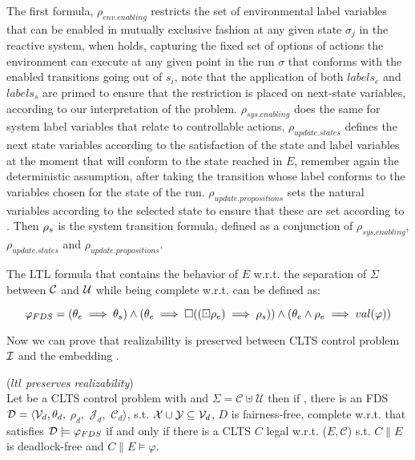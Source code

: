 The first formula, $\rho_{env.enabling}$ restricts the set of environmental label variables that can be enabled in mutually exclusive fashion at any given state $\sigma_j$ in the reactive system, when  holds, capturing the fixed set of options of actions the environment can execute at any given point in the run $\sigma$ that conforms with the enabled transitions going out of $s_i$, note that the application of both $labels_e$ and $labels_s$ are primed to ensure that the restriction is placed on next-state variables, according to our interpretation of the problem. $\rho_{sys.enabling}$ does the same for system label variables that relate to controllable actions, $\rho_{update.states}$ defines the next state variables according to the satisfaction of the state and label variables at the moment that will conform to the state reached in $E$, remember again the deterministic assumption, after taking the transition whose label conforms to the variables chosen for the state of the run. $\rho_{update.propositions}$ sets the natural variables according to the selected state to ensure that these are set according to \valuations. Then ${\rho_s}$ is the system transition formula, defined as a conjunction of $\rho_{sys.enabling}$, $\rho_{update.states}$ and $\rho_{update.propositions}$.
%
%


The LTL formula that contains the behavior of $E$ w.r.t. the separation of $\Sigma$ between $\mathcal{C}$ and $\mathcal{U}$ while being complete w.r.t. \gsX can be defined as:

\[ \varphi_{FDS} = (\theta_e \implies \theta_s) \wedge (\theta_e \implies \square((\boxdot \rho_e) \implies \rho_s)) \wedge (\theta_e \wedge \rho_e \implies val(\varphi)) \]

Now we can prove that realizability is preserved between CLTS control problem $\mathcal{I}$ and the embedding \fdsEmbedding.

\begin{theorem}(\emph{$ltl$ preserves realizability})\label{theorem:gs_preserves_realizability}\\
	Let \controlProblemDef be a CLTS control problem with \cltsDef and $\Sigma = \mathcal{C}\uplus \mathcal{U}$ then if \fdsEmbeddingDef, there is an FDS $\mathcal{D}= \langle \mathcal{V}_d, \theta_d,$ $\rho_d,$ $\mathcal{J}_d,$ $\mathcal{C}_d\rangle$, s.t. ${\mathcal{X}} \cup {\ensuremath{\mathcal{Y}}} \subseteq \mathcal{V}_d$, $D$ is fairness-free, complete w.r.t. \gsX that satisfies $\mathcal{D} \models \varphi_{FDS}$
	if and only if there is a CLTS $C$ legal w.r.t. ($E,\mathcal{C}$) s.t. $C \parallel E$ is deadlock-free and $C \parallel E \models \varphi$.
	\normalsize
\end{theorem}

